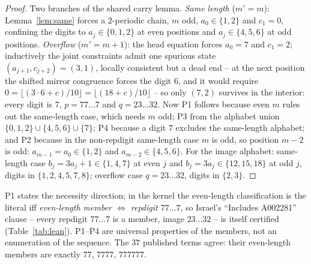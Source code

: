 \begin{proof}
Two branches of the shared carry lemma. \emph{Same
length} ($m' = m$): Lemma~\ref{lem:same} forces a
$2$-periodic chain, $m$ odd, $a_0 \in \{1,2\}$ and
$c_1 = 0$, confining the digits to
$a_j \in \{0,1,2\}$ at even positions and
$a_j \in \{4,5,6\}$ at odd positions. \emph{Overflow}
($m' = m+1$): the head equation forces $a_0 = 7$ and
$c_1 = 2$; inductively the joint constraints admit one
spurious state $(a_{j+1}, c_{j+2}) = (3,1)$, locally
consistent but a dead end -- at the next position the
shifted mirror congruence forces the digit $6$, and it
would require $0 = \lfloor(3 \cdot 6 + c)/10\rfloor =
\lfloor(18 + c)/10\rfloor$ -- so only
$(7,2)$ survives in the interior: every digit is $7$,
$p = 77\ldots7$ and $q = 23\ldots32$. Now P1 follows
because even $m$ rules out the same-length case, which
needs $m$ odd; P3 from the alphabet union
$\{0,1,2\} \cup \{4,5,6\} \cup \{7\}$; P4 because a digit
$7$ excludes the same-length alphabet; and P2 because in
the non-repdigit same-length case $m$ is odd, so position
$m-2$ is odd: $a_{m-1} = a_0 \in \{1,2\}$ and
$a_{m-2} \in \{4,5,6\}$. For the image alphabet:
same-length case $b_j = 3a_j + 1 \in \{1,4,7\}$ at even
$j$ and $b_j = 3a_j \in \{12,15,18\}$ at odd $j$, digits
in $\{1,2,4,5,7,8\}$; overflow case $q = 23\ldots32$,
digits in $\{2,3\}$.
\end{proof}

\begin{remark}
\label{rem:k3-iff}
P1 states the necessity direction; in the kernel the
even-length classification is the literal iff
\emph{even-length member $\Leftrightarrow$ repdigit
$77\ldots7$}, so Israel's ``Includes A002281'' clause --
every repdigit $77\ldots7$ is a member, image
$23\ldots32$ -- is itself certified
(Table~\ref{tab:lean}). P1--P4 are universal properties
of the members, not an enumeration of the sequence. The
$37$ published terms agree: their even-length members
are exactly $77$, $7777$, $777777$.
\end{remark}
